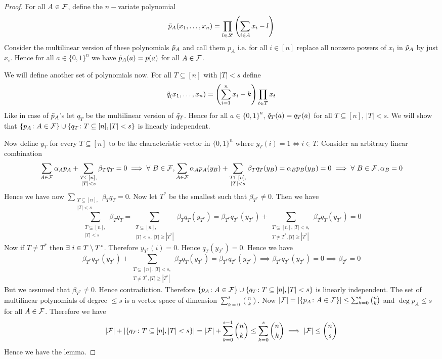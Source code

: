 \documentclass[twoside]{article}
\begin{document}
\begin{proof}
	For all $A\in\mathcal{F}$, define the $n-$variate polynomial $$\tilde{p}_A(x_1,\dots, x_n)=\prod\limits_{l\in{\mathscr{L}}}\left(\sum_{i\in A}x_i-l\right)$$Consider the multilinear version of these polynomials $\tilde{p}_A$ and call them $p_A$ i.e. for all $i\in [n]$ replace all nonzero powers of $x_i$ in $\tilde{p}_A$ by just $x_i$. Hence for all $a\in\{0,1\}^n$ we have $\tilde{p}_A(a)=p(a)$ for all $A\in\mathcal{F}$.
	
	We will define another set of polynomials now. For all $T\subseteq [n]$ with $|T|<s$ define $$\tilde{q}_(x_1,\dots, x_n)=\left(\sum_{i=1}^nx_i-k\right)\prod_{t\in T}x_t$$Like in case of $\tilde{p}_A$'s let $q_T$ be the multilinear version of $\tilde{q}_T$. Hence for all $a\in\{0,1\}^n$, $\tilde{q}_T(a)=q_T(a)$ for all $T\subseteq [n]$, $|T|<s$. We will show that $\{p_A\colon A\in\mathcal{F}\}\cup \{q_T\colon T\subseteq [n],|T|<s\}$ is linearly independent.
	
	Now define $y_T$ for every $T\subseteq[n]$ to be the characteristic vector in $\{0,1\}^n$ where $y_T(i)=1\iff i\in T$. Consider an arbitrary linear combination $$\sum\limits_{A\in\mathcal{F}}\alpha_Ap_A+\sum\limits_{\substack{T\subseteq[n],\\ |T|<s}}\beta_Tq_T=0\implies \forall\ B\in\mathcal{F}, \sum\limits_{A\in\mathcal{F}}\alpha_Ap_A(y_B)+\sum\limits_{\substack{T\subseteq[n],\\ |T|<s}}\beta_Tq_T(y_B)= \alpha_Bp_B(y_B)=0\implies\forall\ B\in\mathcal{F}, \alpha_B=0$$Hence we have now $\sum\limits_{\substack{T\subseteq[n],\\ |T|<s}}\beta_Tq_T=0$. Now let $T^*$ be the smallest such that $\beta_{T^*}\neq 0$. Then we have $$\sum\limits_{\substack{T\subseteq[n],\\ |T|<s}}\beta_Tq_T=\sum\limits_{\substack{T\subseteq[n],\\ |T|<s,\ |T|\geq |T^*|}}\beta_Tq_T(y_{T^*})=\beta_{T^*}q_{T^*}(y_{T^*})+\sum\limits_{\substack{T\subseteq[n], |T|<s,\\ T\neq T^*, |T|\geq |T^*|}}\beta_Tq_T(y_{T^*})=0$$Now if $T\neq T^*$ then $\exists\ i\in T\setminus T^*$. Therefore $y_{T^*}(i)=0$. Hence $q_T(y_{T^*})=0$. Hence we have $$\beta_{T^*}q_{T^*}(y_{T^*})+\sum\limits_{\substack{T\subseteq[n], |T|<s,\\ T\neq T^*, |T|\geq |T^*|}}\beta_Tq_T(y_{T^*})=\beta_{T^*}q_{T^*}(y_{T^*})\implies \beta_{T^*}q_{T^*}(y_{T^*})=0\implies \beta_{T^*}=0$$But we assumed that $\beta_{T^*}\neq 0$. Hence contradiction. Therefore $\{p_A\colon A\in\mathcal{F}\}\cup \{q_T\colon T\subseteq [n],|T|<s\}$ is linearly independent. The set of multilinear polynomials of degree $\leq s$ is a vector space of dimension $\sum\limits_{k=0}^s\binom{n}{k}$. Now $|\mathcal{F}|=|\{p_A\colon A\in \mathcal{F}\}|\leq \sum_{k=0}^s\binom{n}{k}$ and $\deg p_A\leq s$ for all $A\in\mathcal{F}$. Therefore we have $$|\mathcal{F}|+|\{q_T\colon T\subseteq[n],|T|<s\}|=|\mathcal{F}|+\sum_{k=0}^{s-1}\binom{n}{k}\leq \sum_{k=0}^{s}\binom{n}{k}\implies |\mathcal{F}|\leq \binom{n}{s}$$Hence we have the lemma.
\end{proof}
\end{document}
